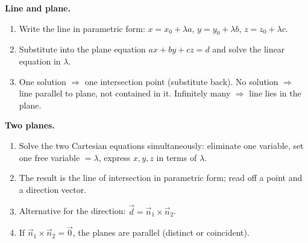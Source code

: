 \documentclass[11pt]{article}
\begin{document}
\begin{methode}
\textbf{Line and plane.}
\begin{enumerate}
\item Write the line in parametric form: $x = x_0 + \lambda a$, $y = y_0 + \lambda b$, $z = z_0 + \lambda c$.
\item Substitute into the plane equation $ax+by+cz=d$ and solve the linear equation in $\lambda$.
\item One solution $\Rightarrow$ one intersection point (substitute back). No solution $\Rightarrow$ line parallel to plane, not contained in it. Infinitely many $\Rightarrow$ line lies in the plane.
\end{enumerate}
\textbf{Two planes.}
\begin{enumerate}
\item Solve the two Cartesian equations simultaneously: eliminate one variable, set one free variable $= \lambda$, express $x, y, z$ in terms of $\lambda$.
\item The result is the line of intersection in parametric form; read off a point and a direction vector.
\item Alternative for the direction: $\vec{d} = \vec{n}_1 \times \vec{n}_2$.
\item If $\vec{n}_1 \times \vec{n}_2 = \vec{0}$, the planes are parallel (distinct or coincident).
\end{enumerate}
\end{methode}
\end{document}
